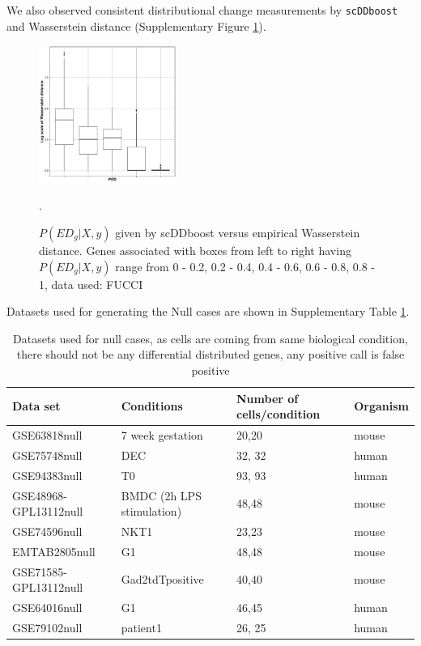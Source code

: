 \documentclass[aoas,preprint]{imsart}
\begin{document}
We also observed consistent distributional change measurements by \texttt{scDDboost} and Wasserstein distance 
(Supplementary Figure \ref{fig:wad}).

\begin{figure}[h!]
\includegraphics[width = 0.4\textwidth]{Figs/Fucci_wadist.pdf}
\caption{$P(ED_g|X,y)$ given by scDDboost versus empirical Wasserstein distance. 
Genes associated with boxes from left to right having $P(ED_g|X,y)$ range from 0 - 0.2, 0.2 - 0.4, 0.4 - 0.6, 0.6 - 0.8, 0.8 - 1, data used: FUCCI}.
 \label{fig:wad}
\end{figure}






Datasets used for generating the Null cases  are shown in Supplementary Table \ref{table:2}.

\begin{table}[h!]
\footnotesize
\centering
\begin{tabular}{ |p{3cm}|p{5cm}|p{3cm}|p{2cm}|}
\hline
 Data set & Conditions & Number of cells/condition & Organism \\
\hline
\hline
GSE63818null & 7 week gestation  & 20,20 &mouse \\
\hline
GSE75748null & DEC & 32, 32 & human\\
\hline
GSE94383null & T0 & 93, 93 & human \\
\hline
GSE48968-GPL13112null & BMDC (2h LPS stimulation) & 48,48 & mouse \\
 \hline
 GSE74596null & NKT1 & 23,23 & mouse\\
 \hline
 EMTAB2805null & G1 & 48,48 & mouse\\
 \hline
GSE71585-GPL13112null &Gad2tdTpositive  & 40,40 & mouse \\
\hline
GSE64016null & G1 & 46,45 & human \\
\hline
GSE79102null & patient1 & 26, 25 & human\\
\hline
\end{tabular}
\caption{Datasets used for null cases, as cells are coming from same biological condition, there should not be any differential distributed genes, any positive call is false positive}
\label{table:2}
\end{table}
\end{document}
